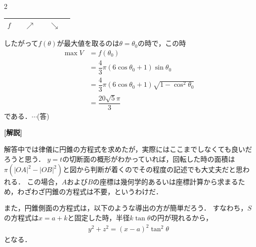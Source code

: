 \documentclass[../../main.tex]{subfiles}
\begin{document}
\begin{multicols}{2}
\begin{table}[H]
\begin{tabular}{|c||c|c|c|c|c|}
  $f$          &     & $\nearrow$ &            & $\searrow$ &         \\ \hline
\end{tabular}
\end{table}
したがって$f(\theta)$が最大値を取るのは$\theta=\theta_0$の時で，この時
\begin{align}
\max V
& = f(\theta_0)                                             \\
& = \dfrac{4}{3}\pi (6\cos\theta_0+1)\sin\theta_0            \\
& = \dfrac{4}{3}\pi (6\cos\theta_0+1)\sqrt{1-\cos^2\theta_0} \\
& =\dfrac{20\sqrt{5}\pi}{3}
\end{align}
である．$\cdots$(答)

{\bf [解説]}

解答中では律儀に円錐の方程式を求めたが，実際にはここまでしなくても良いだろうと思う．
$y=t$の切断面の概形がわかっていれば，回転した時の面積は$\pi(|OA|^2-|OB|^2)$と図から判断が着くのでその程度の記述でも大丈夫だと思われる．
この場合，$A$および$B$の座標は幾何学的あるいは座標計算から求まるため，わざわざ円錐の方程式は不要，というわけだ．

また，円錐側面の方程式は，以下のような導出の方が簡単だろう．
すなわち，$S$の方程式は$x=a+k$と固定した時，半径$k \tan \theta$の円が現れるから，
\begin{align}
y^2+z^2 = (x-a)^2\tan^2\theta
\end{align}
となる．

\newpage
\end{multicols}
\end{document}
